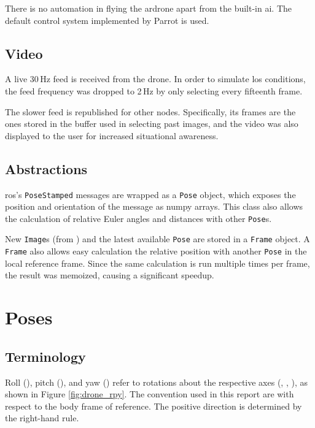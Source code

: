    There is no automation in flying the \gls{ardrone} apart from the built-in \gls{ai}.
    The default control system implemented by Parrot is used.

  \section{Video}
    A live 30\,Hz feed is received from the drone.
    In order to simulate \gls{los} conditions, the feed frequency was dropped to 2\,Hz by only selecting every fifteenth frame.

    The slower feed is republished for other nodes.
    Specifically, its frames are the ones stored in the buffer used in selecting past images, and the video was also displayed to the user for increased situational awareness.

  \section{Abstractions}
    \gls{ros}'s \texttt{PoseStamped} messages are wrapped as a \texttt{Pose} object, which exposes the position and orientation of the message as numpy arrays.
    This class also allows the calculation of relative Euler angles and distances with other \texttt{Pose}s.

    New \texttt{Image}s (from \texttt{}) and the latest available \texttt{Pose} are stored in a \texttt{Frame} object.
    A \texttt{Frame} also allows easy calculation the relative position with another \texttt{Pose} in the local reference frame.
    Since the same calculation is run multiple times per frame, the result was memoized, causing a significant speedup.
  

\chapter{Poses}
\label{sec:poses}
  \section{Terminology}
    Roll (), pitch (), and yaw () refer to rotations about the respective axes (, , ), as shown in Figure \ref{fig:drone_rpy}.
    The convention used in this report are with respect to the body frame of reference. The positive direction is determined by the right-hand rule.

